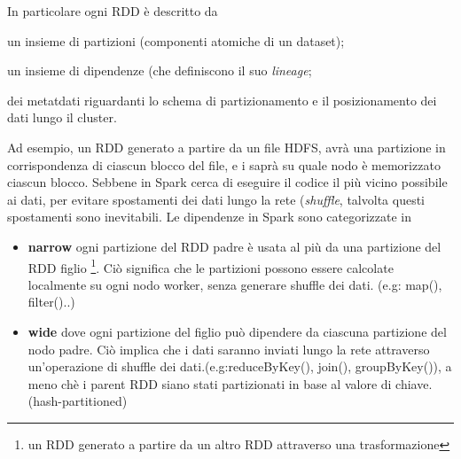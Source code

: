 In particolare   ogni RDD è descritto da  
\begin{inlinelist}
  \item un insieme di partizioni (componenti atomiche di un dataset);
  \item un insieme di dipendenze (che definiscono il suo \emph{lineage};
  \item dei metatdati riguardanti lo schema di partizionamento e il posizionamento dei dati lungo il cluster.
\end{inlinelist}
Ad esempio, un RDD generato a partire da un file HDFS, avrà una partizione  in corrispondenza di ciascun blocco del file, e i saprà su quale nodo è memorizzato ciascun blocco.
Sebbene in Spark  cerca di eseguire il codice il più vicino possibile ai dati, per evitare spostamenti dei dati lungo la rete (\emph{shuffle}, talvolta questi spostamenti sono inevitabili.
Le dipendenze in Spark  sono categorizzate in
\begin{itemize}
\item \textbf{narrow}  
ogni partizione del RDD padre è usata al più da una partizione del RDD figlio \footnote{un RDD generato a partire da un altro RDD attraverso una trasformazione}. Ciò significa che le partizioni possono essere calcolate localmente su ogni nodo worker, senza generare shuffle dei dati. (e.g: map(), filter()..) 
 \item \textbf{wide}  dove ogni partizione del figlio può dipendere da ciascuna partizione del nodo padre. Ciò implica che i dati saranno inviati lungo la rete attraverso un'operazione di shuffle dei dati.(e.g:reduceByKey(), join(), groupByKey()), a meno chè i parent RDD siano stati partizionati in base al valore di chiave.(hash-partitioned)
\end{itemize}

